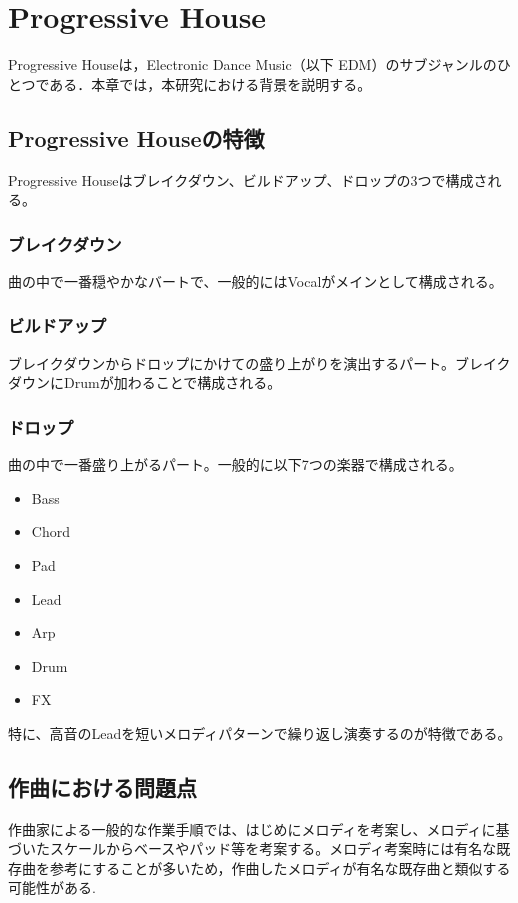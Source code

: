 \chapter{Progressive House}
Progressive Houseは，Electronic Dance Music（以下 EDM）のサブジャンルのひとつである．本章では，本研究における背景を説明する。

\section{Progressive Houseの特徴}
Progressive Houseはブレイクダウン、ビルドアップ、ドロップの3つで構成される。
\subsection{ブレイクダウン}
曲の中で一番穏やかなバートで、一般的にはVocalがメインとして構成される。

\subsection{ビルドアップ}
ブレイクダウンからドロップにかけての盛り上がりを演出するパート。ブレイクダウンにDrumが加わることで構成される。

\subsection{ドロップ}
曲の中で一番盛り上がるパート。一般的に以下7つの楽器で構成される。

\begin{itemize}
  \item Bass
  \item Chord
  \item Pad
  \item Lead
  \item Arp
  \item Drum
  \item FX
\end{itemize}

特に、高音のLeadを短いメロディパターンで繰り返し演奏するのが特徴である。

\section{作曲における問題点}
作曲家による一般的な作業手順では、はじめにメロディを考案し、メロディに基づいたスケールからベースやパッド等を考案する。メロディ考案時には有名な既存曲を参考にすることが多いため，作曲したメロディが有名な既存曲と類似する可能性がある.

